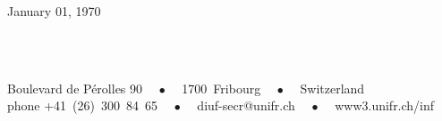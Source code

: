 \begin{titlepage}
\begin{center}
January 01, 1970 %
\vspace*{.06\textheight}

\groupname\\\deptname\\ %
\vfill

\footnotesize{ Boulevard de Pérolles 90 ~~$\bullet$~~ 1700~Fribourg ~~$\bullet$~~ Switzerland
            \\
            phone +41~(26)~300~84~65 ~~$\bullet$~~ \textsf{diuf-secr@unifr.ch} ~~$\bullet$~~ \textsf{www3.unifr.ch/inf}
            }


\end{center}
\end{titlepage}
